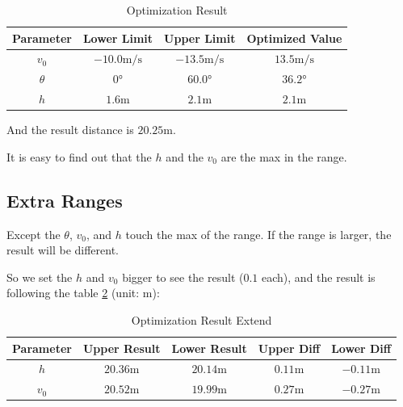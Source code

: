\documentclass{article}
\begin{document}
\begin{table}[H]
    \centering
    \begin{tabular}{cccc}
        \hline
        \textbf{Parameter} & \textbf{Lower Limit} & \textbf{Upper Limit} & \textbf{Optimized Value} \\
        \hline
        $v_0$ & $-10.0\si{\meter/\second}$ & $-13.5\si{\meter/\second}$ & $13.5\si{\meter/\second}$ \\
        $\theta$ & $0\si{\degree}$ & $60.0\si{\degree}$ & $36.2\si{\degree}$ \\
        $h$ & $1.6\si{\meter}$ & $2.1\si{\meter}$ & $2.1\si{\meter}$ \\
        \hline
    \end{tabular}
    \caption{Optimization Result}
    \label{table:optimization-result}
\end{table}

And the result distance is $20.25\si{\meter}$.

It is easy to find out that the $h$ and the $v_0$ are the max in the range.

\subsection{Extra Ranges}

\label{subsection:extra-ranges}

Except the $\theta$, $v_0$, and $h$ touch the max of the range. If the range is larger, the result will be different.

So we set the $h$ and $v_0$ bigger to see the result ($0.1$ each), and the result is following the table \ref{table:optimization-result-extend} (unit: \si{\meter}):


\begin{table}[H]
    \centering
    \begin{tabular}{ccccc}
        \hline
        \textbf{Parameter} & \textbf{Upper Result} & \textbf{Lower Result} & \textbf{Upper Diff} & \textbf{Lower Diff} \\
        \hline
        $h$ & $20.36\si{\meter}$ & $20.14\si{\meter}$ & $0.11\si{\meter}$ & $-0.11\si{\meter}$ \\
        $v_0$ & $20.52\si{\meter}$ & $19.99\si{\meter}$ & $0.27\si{\meter}$ & $-0.27\si{\meter}$ \\
        \hline
    \end{tabular}
    \caption{Optimization Result Extend}
    \label{table:optimization-result-extend}
\end{table}
\end{document}
